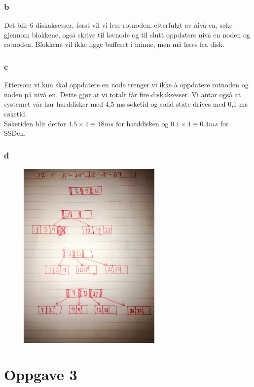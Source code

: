 \documentclass[a4paper, 10pt]{article}
\begin{document}
\subsubsection*{b}
Det blir 6 diskaksesser, først vil vi lese rotnoden, etterfulgt av nivå en, søke gjennom blokkene, også skrive til løvnode og til slutt oppdatere nivå en noden og rotnoden. Blokkene vil ikke ligge bufferet i minne, men må leses fra disk.

\subsubsection*{c}
Ettersom vi kun skal oppdatere en node trenger vi ikke å oppdatere rotnoden og noden på nivå en. Dette gjør at vi totalt får fire diskaksesser. Vi antar også at systemet vår har harddisker med 4,5 ms søketid og solid state drives med 0,1 ms søketid.\\
Søketiden blir derfor $4.5 \times 4 \equiv 18 ms$ for harddisken og $0.1 \times 4 \equiv 0.4 ms$ for SSDen.

\subsubsection*{d}

\begin{figure}[H]
    \begin{center}
        \includegraphics[width=7cm] {img/1891571_10153958793075161_6316017_o.jpg}
    \end{center}
\end{figure}

\section*{Oppgave 3}
\end{document}
